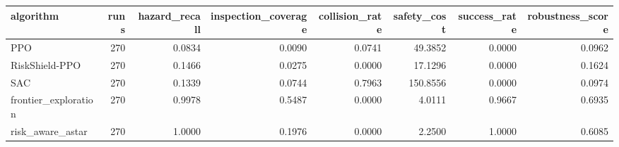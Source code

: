 \begin{tabular}{lrrrrrrr}
\toprule
algorithm & runs & hazard_recall & inspection_coverage & collision_rate & safety_cost & success_rate & robustness_score \\
\midrule
PPO & 270 & 0.0834 & 0.0090 & 0.0741 & 49.3852 & 0.0000 & 0.0962 \\
RiskShield-PPO & 270 & 0.1466 & 0.0275 & 0.0000 & 17.1296 & 0.0000 & 0.1624 \\
SAC & 270 & 0.1339 & 0.0744 & 0.7963 & 150.8556 & 0.0000 & 0.0974 \\
frontier_exploration & 270 & 0.9978 & 0.5487 & 0.0000 & 4.0111 & 0.9667 & 0.6935 \\
risk_aware_astar & 270 & 1.0000 & 0.1976 & 0.0000 & 2.2500 & 1.0000 & 0.6085 \\
\bottomrule
\end{tabular}
